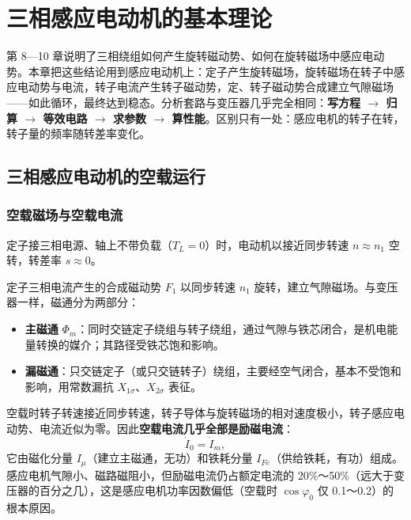 \chapter{三相感应电动机的基本理论}

第 8—10 章说明了三相绕组如何产生旋转磁动势、如何在旋转磁场中感应电动势。本章把这些结论用到感应电动机上：定子产生旋转磁场，旋转磁场在转子中感应电动势与电流，转子电流产生转子磁动势，定、转子磁动势合成建立气隙磁场——如此循环，最终达到稳态。分析套路与变压器几乎完全相同：\textbf{写方程 $\rightarrow$ 归算 $\rightarrow$ 等效电路 $\rightarrow$ 求参数 $\rightarrow$ 算性能}。区别只有一处：感应电机的转子在转，转子量的频率随转差率变化。

\section{三相感应电动机的空载运行}

\subsection{空载磁场与空载电流}
定子接三相电源、轴上不带负载（$T_L=0$）时，电动机以接近同步转速 $n\approx n_1$ 空转，转差率 $s\approx0$。

定子三相电流产生的合成磁动势 $F_1$ 以同步转速 $n_1$ 旋转，建立气隙磁场。与变压器一样，磁通分为两部分：
\begin{itemize}
  \item \textbf{主磁通} $\Phi_m$：同时交链定子绕组与转子绕组，通过气隙与铁芯闭合，是机电能量转换的媒介；其路径受铁芯饱和影响。
  \item \textbf{漏磁通}：只交链定子（或只交链转子）绕组，主要经空气闭合，基本不受饱和影响，用常数漏抗 $X_{1\sigma}$、$X_{2\sigma}$ 表征。
\end{itemize}

空载时转子转速接近同步转速，转子导体与旋转磁场的相对速度极小，转子感应电动势、电流近似为零。因此\textbf{空载电流几乎全部是励磁电流}：
\begin{equation}
\dot I_0=\dot I_m ,
\end{equation}
它由磁化分量 $I_\mu$（建立主磁通，无功）和铁耗分量 $I_{Fe}$（供给铁耗，有功）组成。感应电机气隙小、磁路磁阻小，但励磁电流仍占额定电流的 20\%～50\%（远大于变压器的百分之几），这是感应电机功率因数偏低（空载时 $\cos\varphi_0$ 仅 0.1～0.2）的根本原因。

